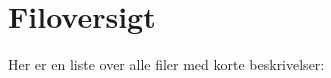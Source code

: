 \section{Filoversigt}
Her er en liste over alle filer med korte beskrivelser\+:\begin{DoxyCompactList}
\item{}
\item{}
\end{DoxyCompactList}
